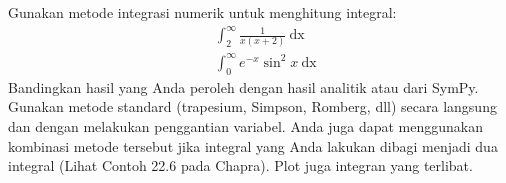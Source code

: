 \begin{soal}
Gunakan metode integrasi numerik untuk menghitung integral:
\begin{align}
& \int_{2}^{\infty} \frac{1}{x(x + 2)}\ \mathrm{dx} \\
& \int_{0}^{\infty} e^{-x} \sin^{2} x\ \mathrm{dx}
\end{align}
Bandingkan hasil yang Anda peroleh dengan hasil analitik atau dari SymPy.
Gunakan metode standard (trapesium, Simpson, Romberg, dll) secara
langsung dan dengan melakukan penggantian variabel. Anda juga dapat menggunakan
kombinasi metode tersebut jika integral yang Anda lakukan dibagi menjadi dua
integral (Lihat Contoh 22.6 pada Chapra). Plot juga integran yang terlibat.
\end{soal}